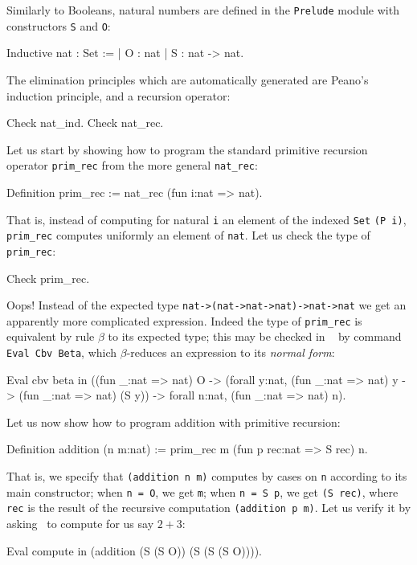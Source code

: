 \documentclass[11pt,a4paper]{book}
\begin{document}
Similarly to Booleans, natural numbers are defined in the \verb:Prelude:
module with constructors \verb:S: and \verb:O::
\begin{coq_example}
Inductive nat : Set :=
  | O : nat
  | S : nat -> nat.
\end{coq_example}

The elimination principles which are automatically generated are Peano's
induction principle, and a recursion operator:
\begin{coq_example}
Check nat_ind.
Check nat_rec.
\end{coq_example}

Let us start by showing how to program the standard primitive recursion
operator \verb:prim_rec: from the more general \verb:nat_rec::
\begin{coq_example}
Definition prim_rec := nat_rec (fun i:nat => nat).
\end{coq_example}

That is, instead of computing for natural \verb:i: an element of the indexed
\verb:Set: \verb:(P i):, \verb:prim_rec: computes uniformly an element of 
\verb:nat:. Let us check the type of \verb:prim_rec::
\begin{coq_example}
Check prim_rec.
\end{coq_example}

Oops! Instead of the expected type \verb+nat->(nat->nat->nat)->nat->nat+ we
get an apparently more complicated expression. Indeed the type of
\verb:prim_rec: is equivalent by rule $\beta$ to its expected type; this may
be checked in \Coq~ by command \verb:Eval Cbv Beta:, which $\beta$-reduces
an expression to its {\sl normal form}:
\begin{coq_example}
Eval cbv beta in
  ((fun _:nat => nat) O ->
   (forall y:nat, 
      (fun _:nat => nat) y -> (fun _:nat => nat) (S y)) ->
   forall n:nat, (fun _:nat => nat) n).
\end{coq_example}

Let us now show how to program addition with primitive recursion:
\begin{coq_example}
Definition addition (n m:nat) :=
    prim_rec m (fun p rec:nat => S rec) n.
\end{coq_example}

That is, we specify that \verb+(addition n m)+ computes by cases on \verb:n:
according to its main constructor; when \verb:n = O:, we get \verb:m:;
 when \verb:n = S p:, we get \verb:(S rec):, where \verb:rec: is the result
of the recursive computation \verb+(addition p m)+. Let us verify it by
asking \Coq~to compute for us say $2+3$:
\begin{coq_example}
Eval compute in (addition (S (S O)) (S (S (S O)))).
\end{coq_example}
\end{document}
